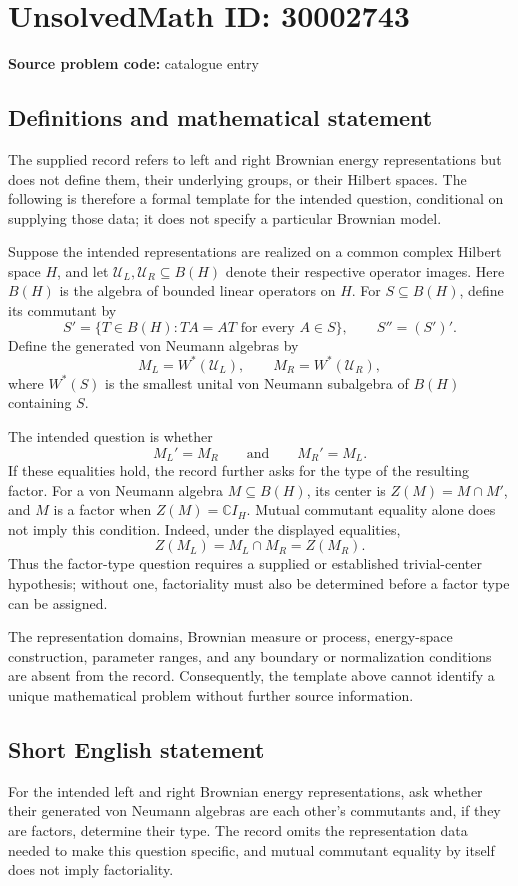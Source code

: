 \documentclass[11pt]{article}
\newcommand{\C}{\mathbb{C}}
\begin{document}
\section*{UnsolvedMath ID: 30002743}
\textbf{Source problem code:} catalogue entry
\subsection{Definitions and mathematical statement}
The supplied record refers to left and right Brownian energy representations but does not define them, their underlying groups, or their Hilbert spaces. The following is therefore a formal template for the intended question, conditional on supplying those data; it does not specify a particular Brownian model.

Suppose the intended representations are realized on a common complex Hilbert space \(H\), and let \(\mathcal U_L,\mathcal U_R\subseteq B(H)\) denote their respective operator images. Here \(B(H)\) is the algebra of bounded linear operators on \(H\). For \(S\subseteq B(H)\), define its commutant by
\[
S'=\{T\in B(H):TA=AT\text{ for every }A\in S\},
\qquad S''=(S')'.
\]
Define the generated von Neumann algebras by
\[
M_L=W^*(\mathcal U_L),\qquad M_R=W^*(\mathcal U_R),
\]
where \(W^*(S)\) is the smallest unital von Neumann subalgebra of \(B(H)\) containing \(S\).

The intended question is whether
\[
M_L'=M_R\qquad\text{and}\qquad M_R'=M_L.
\]
If these equalities hold, the record further asks for the type of the resulting factor. For a von Neumann algebra \(M\subseteq B(H)\), its center is \(Z(M)=M\cap M'\), and \(M\) is a factor when \(Z(M)=\C I_H\). Mutual commutant equality alone does not imply this condition. Indeed, under the displayed equalities,
\[
Z(M_L)=M_L\cap M_R=Z(M_R).
\]
Thus the factor-type question requires a supplied or established trivial-center hypothesis; without one, factoriality must also be determined before a factor type can be assigned.

The representation domains, Brownian measure or process, energy-space construction, parameter ranges, and any boundary or normalization conditions are absent from the record. Consequently, the template above cannot identify a unique mathematical problem without further source information.
\subsection{Short English statement}
For the intended left and right Brownian energy representations, ask whether their generated von Neumann algebras are each other's commutants and, if they are factors, determine their type. The record omits the representation data needed to make this question specific, and mutual commutant equality by itself does not imply factoriality.
\end{document}
